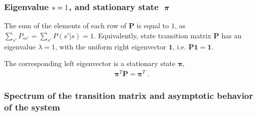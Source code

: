 \documentclass[letterpaper,10pt,english]{jupyterBook}
\begin{document}
\subsubsection{Eigenvalue \protect\(s = 1\protect\), and stationary state \protect\(\ \boldsymbol\pi\protect\)}
\label{\detokenize{ch/statistical-mechanics/markov-process-notes:eigenvalue-s-1-and-stationary-state-boldsymbol-pi}}
\sphinxAtStartPar
The sum of the elements of each row of \(\mathbf{P}\) is equal to \(1\), as \(\sum_{s'} P_{ss'} = \sum_{s'} P(s' | s) = 1\). Equivalently, state transition matrix \(\mathbf{P}\) has an eigenvalue \(\lambda = 1\), with the uniform right eigenvector \(\mathbf{1}\), i.e. \(\mathbf{P} \mathbf{1} = \mathbf{1}\).

\sphinxAtStartPar
The corresponding left eigenvector is a stationary state \(\boldsymbol\pi\),
\begin{equation*}
\begin{split}\boldsymbol\pi^T \mathbf{P} = \boldsymbol\pi^T \ .\end{split}
\end{equation*}

\subsubsection{Spectrum of the transition matrix and asymptotic behavior of the system}
\label{\detokenize{ch/statistical-mechanics/markov-process-notes:spectrum-of-the-transition-matrix-and-asymptotic-behavior-of-the-system}}
\sphinxAtStartPar
{} 
\end{document}
